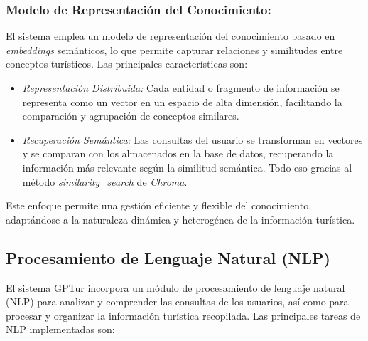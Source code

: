 \documentclass[10pt]{llncs}
\begin{document}
\subsubsection{Modelo de Representación del Conocimiento:}

El sistema emplea un modelo de representación del conocimiento basado en \textit{embeddings} semánticos, lo que permite capturar relaciones y similitudes entre conceptos turísticos. Las principales características son:

\begin{itemize}
    \item \textit{Representación Distribuida:} Cada entidad o fragmento de información se representa como un vector en un espacio de alta dimensión, facilitando la comparación y agrupación de conceptos similares.
    \item \textit{Recuperación Semántica:} Las consultas del usuario se transforman en vectores y se comparan con los almacenados en la base de datos, recuperando la información más relevante según la similitud semántica. Todo 
    eso gracias al método \textit{similarity\_search} de \textit{Chroma}.
\end{itemize}

Este enfoque permite una gestión eficiente y flexible del conocimiento, adaptándose a la naturaleza dinámica y heterogénea de la información turística.

\vspace{\baselineskip}
\subsection{Procesamiento de Lenguaje Natural (NLP)}

El sistema GPTur incorpora un módulo de procesamiento de lenguaje natural (NLP) para analizar y comprender las consultas de los usuarios, así como para procesar y organizar la información turística recopilada. Las principales tareas de 
NLP implementadas son:
\end{document}
